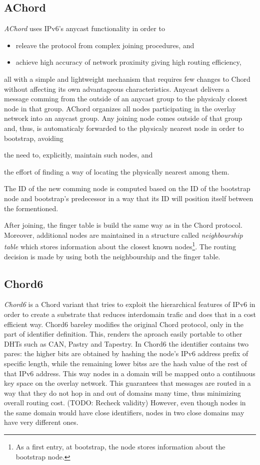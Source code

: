 \documentclass[a4paper,10pt]{article}
\begin{document}
\subsection{AChord}
\emph{AChord}\cite{dao_achord_2006} uses IPv6's anycast functionality in order to
\begin{itemize}
 \item releave the protocol from complex joining procedures, and
 \item achieve high accuracy of network proximity giving high routing efficiency,
\end{itemize}
all with a simple and lightweight mechanism that requires few changes to Chord without affecting its own advantageous characteristics. Anycast delivers a message comming from the outside of an anycast group to the physicaly closest node in that group. AChord organizes all nodes participating in the overlay network into an anycast group. Any joining node comes outside of that group and, thus, is automaticaly forwarded to the physicaly nearest node in order to bootstrap, avoiding
\begin{inparaenum}
  \item the need to, explicitly, maintain such nodes, and
  \item the effort of finding a way of locating the physically nearest among them.
\end{inparaenum}
The ID of the new comming node is computed based on the ID of the bootstrap node and bootstrap's predecessor in a way that its ID will position itself between the formentioned.

After joining, the finger table is build the same way as in the Chord protocol. Moreover, additional nodes are maintained in a structure called \emph{neighbourship table} which stores information about the closest known nodes\footnote{As a first entry, at bootstrap, the node stores information about the bootstrap node.}. The routing decision is made by using both the neighbourship and the finger table.


\subsection{Chord6}
\emph{Chord6} \cite{xiong_chord6_2005} is a Chord variant that tries to exploit the hierarchical features of IPv6 in order to create a substrate that reduces interdomain trafic and does that in a cost efficient way. Chord6 bareley modifies the original Chord protocol, only in the part of identifier definition. This, renders the aproach easily portable to other DHTs such as CAN, Pastry and Tapestry. In Chord6 the identifier contains two pares: the higher bits are obtained by hashing the  node's IPv6 address prefix of specific length, while the remaining lower bitss are the hash value of the rest of that IPv6 address. This way nodes in a domain will be mapped onto a contihuous key space on the overlay network. This guarantees that messages are routed in a way that they do not hop in and out of domains many time, thus minimizing overall routing cost. (TODO: Recheck validity) However, even though nodes in the same domain would have close identifiers, nodes in two close domains may have very different ones.
\end{document}
